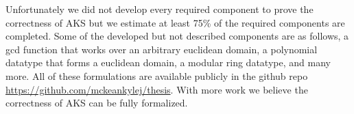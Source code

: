 \documentclass[./Thesis.tex]{subfiles}
\begin{document}
Unfortunately we did not develop every required component to prove the
correctness of AKS but we estimate at least 75\% of the required components are
completed. Some of the developed but not described components are as follows, a
gcd function that works over an arbitrary euclidean domain, a polynomial
datatype that forms a euclidean domain, a modular ring datatype, and many more.
All of these formulations are available publicly in the github repo
\url{https://github.com/mckeankylej/thesis}. With more work we believe the
correctness of AKS can be fully formalized.
\end{document}
